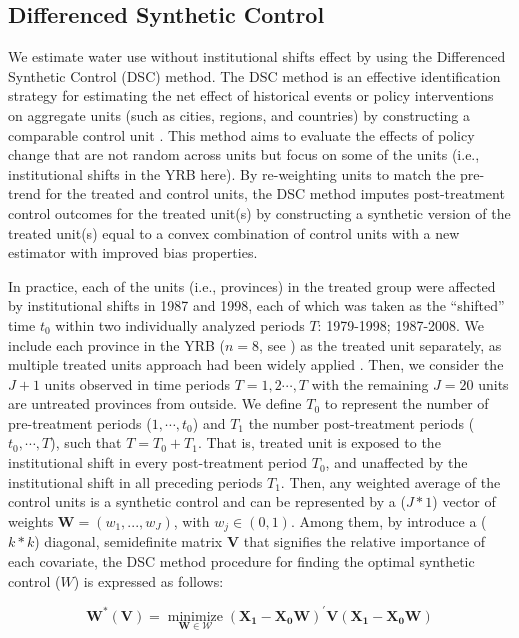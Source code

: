 \subsection{Differenced Synthetic Control}
We estimate water use without institutional shifts effect by using the Differenced Synthetic Control (DSC) method.
The DSC method is an effective identification strategy for estimating the net effect of historical events or policy interventions on aggregate units (such as cities, regions, and countries) by constructing a comparable control unit \cite{abadie2010, abadie2015, hill2021}.
This method aims to evaluate the effects of policy change that are not random across units but focus on some of the units (i.e., institutional shifts in the YRB here).
By re-weighting units to match the pre-trend for the treated and control units, the DSC method imputes post-treatment control outcomes for the treated unit(s) by constructing a synthetic version of the treated unit(s) equal to a convex combination of control units with a new estimator with improved bias properties.

In practice, each of the units (i.e., provinces) in the treated group were affected by institutional shifts in 1987 and 1998, each of which was taken as the ``shifted'' time $t_0$ within two individually analyzed periods $T$: 1979-1998; 1987-2008.
We include each province in the YRB ($n=8$, see \textit{}) as the treated unit separately, as multiple treated units approach had been widely applied \cite{abadie2021}.
Then, we consider the $J+1$ units observed in time periods $T = {1,2 \cdots , T}$ with the remaining $J=20$ units are untreated provinces from outside.
We define $T_0$ to represent the number of pre-treatment periods ($1,\cdots,t_0$) and $T_1$ the number post-treatment periods ($t_0,\cdots,T$), such that $T = T_0+ T_1$.
That is, treated unit is exposed to the institutional shift in every post-treatment period $T_0$, and unaffected by the institutional shift in all preceding periods $T_1$.
Then, any weighted average of the control units is a synthetic control and can be represented by a ($J * 1$) vector of weights $\mathbf{W} = (w_{1},...,w_{J})$, with $w_j \in (0, 1)$.
Among them, by introduce a ($k * k$) diagonal, semidefinite matrix $\mathbf{V}$ that signifies the relative importance of each covariate, the DSC method procedure for finding the optimal synthetic control ($W$) is expressed as follows:

\begin{equation}
    \mathbf{W^{*}(V)}=\underset{\mathbf{W} \in \mathcal{W}}{\operatorname{minimize}}\left(\mathbf{X}_{\mathbf{1}}-\mathbf{X}_{\mathbf{0}} \mathbf{W}\right)^{\prime} \mathbf{V}\left(\mathbf{X}_{\mathbf{1}}-\mathbf{X}_{\mathbf{0}} \mathbf{W}\right)
\end{equation}


